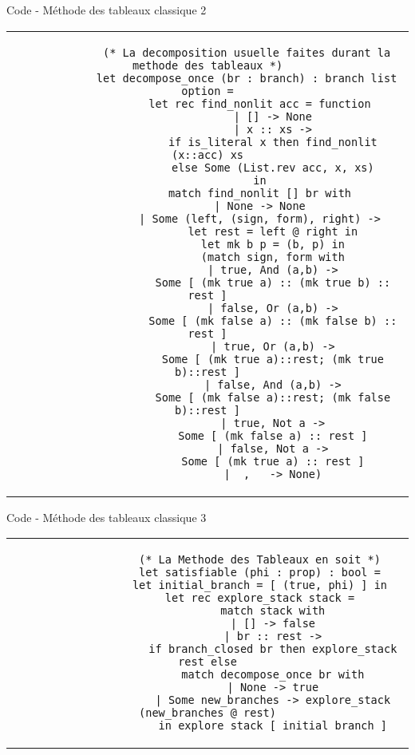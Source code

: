 \documentclass[]{beamer}
\begin{document}
\begin{frame}[fragile]{Code - Méthode des tableaux classique 2}
    \begin{center}
        \begin{tabular}{c}
            \begin{lstlisting}
            (* La decomposition usuelle faites durant la methode des tableaux *)
            let decompose_once (br : branch) : branch list option =
                let rec find_nonlit acc = function
                    | [] -> None
                    | x :: xs ->
                    if is_literal x then find_nonlit (x::acc) xs
                    else Some (List.rev acc, x, xs)
                in
                match find_nonlit [] br with
                | None -> None
                | Some (left, (sign, form), right) ->
                    let rest = left @ right in
                    let mk b p = (b, p) in
                    (match sign, form with
                    | true, And (a,b) ->
                    Some [ (mk true a) :: (mk true b) :: rest ]
                    | false, Or (a,b) ->
                    Some [ (mk false a) :: (mk false b) :: rest ]
                    | true, Or (a,b) ->
                    Some [ (mk true a)::rest; (mk true b)::rest ]
                    | false, And (a,b) ->
                    Some [ (mk false a)::rest; (mk false b)::rest ]
                    | true, Not a ->
                    Some [ (mk false a) :: rest ]
                    | false, Not a ->
                    Some [ (mk true a) :: rest ]
                    | _, _ -> None)
            \end{lstlisting}
        \end{tabular}
    \end{center}
\end{frame}


\begin{frame}[fragile]{Code - Méthode des tableaux classique 3}
    \begin{center}
        \begin{tabular}{c}
            \begin{lstlisting}
                (* La Methode des Tableaux en soit *)
                let satisfiable (phi : prop) : bool =
                let initial_branch = [ (true, phi) ] in
                let rec explore_stack stack =
                    match stack with
                    | [] -> false
                    | br :: rest ->
                    if branch_closed br then explore_stack rest else
                    match decompose_once br with
                    | None -> true
                    | Some new_branches -> explore_stack (new_branches @ rest)
                    in explore_stack [ initial_branch ]
            \end{lstlisting}
        \end{tabular}
    \end{center}
\end{frame}
\end{document}

